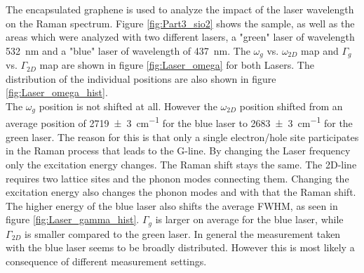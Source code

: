 \documentclass[12pt,a4paper]{article}
\begin{document}
The encapsulated graphene is used to analyze the impact of the laser wavelength on the Raman spectrum. Figure \ref{fig:Part3_sio2} shows the sample, as well as the areas which were analyzed with two different lasers, a "green" laser of wavelength \SI{532}{nm} and a "blue" laser of wavelength of \SI{437}{nm}. The $\omega_g$ vs. $\omega_{2D}$ map and $\Gamma_g$ vs. $\Gamma_{2D}$ map are shown in figure \ref{fig:Laser_omega} for both Lasers. The distribution of the individual positions are also shown in figure \ref{fig:Laser_omega_hist}.\\
The $\omega_g$ position is not shifted at all. However the $\omega_{2D}$ position shifted from an average position of \SI{2719(3)}{cm^{-1}} for the blue laser to \SI{2683(3)}{cm^{-1}} for the green laser. The reason for this is that only a single electron/hole site participates in the Raman process that leads to the G-line. By changing the Laser frequency only the excitation energy changes. The Raman shift stays the same. The 2D-line requires two lattice sites and the phonon modes connecting them. Changing the excitation energy also changes the phonon modes and with that the Raman shift.\\
The higher energy of the blue laser also shifts the average FWHM, as seen in figure \ref{fig:Laser_gamma_hist}. $\Gamma_g$ is larger on average for the blue laser, while $\Gamma_{2D}$ is smaller compared to the green laser. In general the measurement taken with the blue laser seems to be broadly distributed. However this is most likely a consequence of different measurement settings.\\
\\
\end{document}
